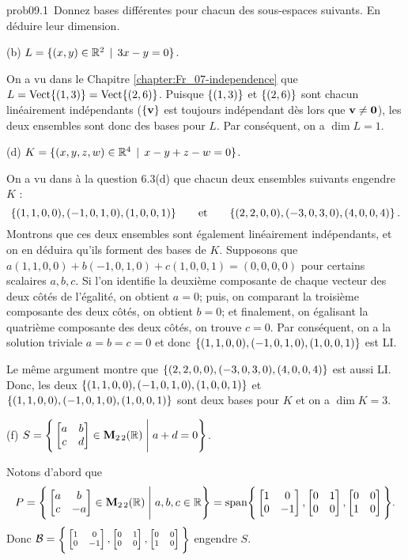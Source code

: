 
\begin{sol}{prob09.1}~Donnez  bases diff\'erentes pour chacun des sous-espaces suivants. En d\'eduire leur dimension.

\medskip
(b)  $L=\set{(x, y) \in \R^2\st 3x - y=0 }$.

\soln On a vu dans le Chapitre \ref{chapter:Fr_07-independence} que $L=\sp{(1,3)}=\sp{(2,6)}$. Puisque $\set{(1,3)}$ et $\set{(2,6)}$ sont chacun linéairement indépendants ($\set{\vv}$ est toujours indépendant dès lors que $\vv \not=\zero$), les deux ensembles sont donc des bases pour $L$. Par conséquent, on a $\dim L=1$.\medskip



 

(d)  $K=\set{(x, y, z, w) \in \R^4\st x-y+z-w=0 }$.

\soln  On a vu dans à la question 6.3(d)  que chacun deux ensembles suivants engendre $K$ :
$$\set{(1,1,0,0),(-1, 0,1,0),(1,0,0,1) }\quad\quad\text{et}\quad\quad\set{(2,2,0,0),(-3, 0,3,0),(4,0,0,4) }\,.$$
Montrons que ces deux ensembles sont également linéairement indépendants, et on en déduira qu'ils forment des bases de $K$. Supposons que $a(1,1,0,0)+b(-1, 0,1,0)+c(1,0,0,1)=(0,0,0,0)$ pour certains scalaires $a,b,c$. 
Si l'on identifie la deuxième composante de chaque vecteur des deux côtés de l'égalité, on obtient $a=0$; puis, on comparant la troisième composante des deux côtés, on obtient $b=0$; et finalement, on égalisant la quatrième composante des deux côtés, on trouve $c=0$. Par conséquent, on a la solution triviale $a=b=c=0$ et donc $\set{(1,1,0,0),(-1, 0,1,0),(1,0,0,1) }$ est LI.

Le m\^eme argument montre que $\set{(2,2,0,0),(-3, 0,3,0),(4,0,0,4) }$ est aussi LI. Donc, les deux $\set{(1,1,0,0),(-1, 0,1,0),(1,0,0,1) }$ et $\set{(1,1,0,0),(-1, 0,1,0),(1,0,0,1) }$ sont deux bases pour $K$ et on a $\dim K=3$.

\medskip

(f)  $S=\Bigg\{  \bmatrix a&b\\ c&d\endbmatrix \in \M_{2 \,2}(\R) \;\Bigg|\; a+d=0\Bigg\}$. 

\soln
Notons d'abord que $$P=\Bigg\{  \bmatrix a&b\\ c&-a\endbmatrix \in \M_{2 \,2}(\R) \;\Bigg|\; a,b,c\in \R\Bigg\}=\text{span}\Bigg\{ \bmatrix 1&0\\ 0&-1\endbmatrix,\bmatrix 0&1\\ 0&0\endbmatrix,\bmatrix 0&0\\ 1&0\endbmatrix \Bigg\}.$$ 
Donc $\mathcal B=\scriptsize\Bigg\{ \bmatrix 1&0\\ 0&-1\endbmatrix,\bmatrix 0&1\\ 0&0\endbmatrix,\bmatrix 0&0\\ 1&0\endbmatrix \Bigg\}$ engendre $S$.


\end{sol}
